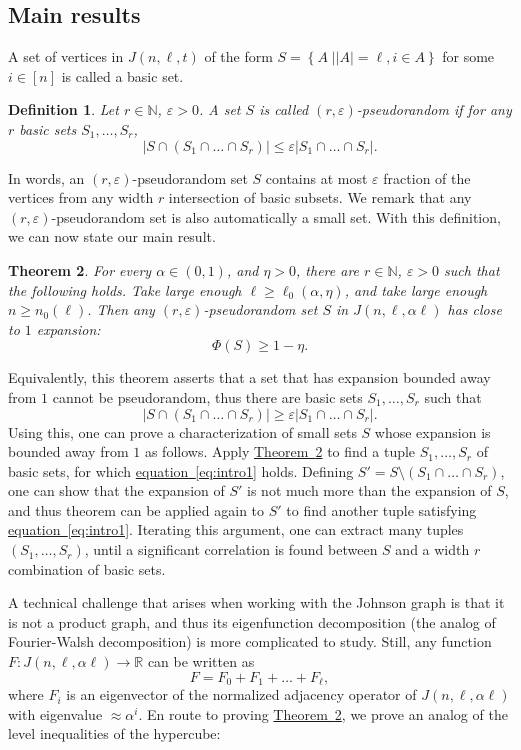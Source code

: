 \documentclass[11pt]{article}
\newcommand{\expref}[2]{\texorpdfstring{\hyperref[#2]{#1~\ref{#2}}}{#1~\ref{#2}}}
\newtheorem{theorem}{Theorem}[section]
\newtheorem{definition}[theorem]{Definition}
\newcommand{\expeqref}[2]{\texorpdfstring{\hyperref[#2]{#1~\eqref{#2}}}{#1~\eqref{#2}}}
\newcommand\card[1]{\left| {#1} \right|}
\newcommand\sett[2]{\left\{ \left. #1 \;\right\vert #2 \right\}}
\newcommand\skipi{{\vskip 10pt}}
\newcommand\eps{\varepsilon}
\renewcommand\geq{\geqslant}
\renewcommand\leq{\leqslant}
\begin{document}
\subsection{Main results}
A set of vertices in $J(n,\ell,t)$ of the form $S = \sett{A}{\card{A} = \ell, i\in A}$ for some $i\in [n]$ is called a
basic set.
\begin{definition}
  Let $r\in\mathbb{N}$, $\eps>0$. A set $S$ is called \emph{$(r,\eps)$-pseudorandom} if for any $r$ basic sets $S_1,\ldots,S_r$, %
  \[
   \card{S\cap (S_1\cap\ldots\cap S_r)}\leq \eps \card{S_1\cap\ldots\cap S_r}.
  \]
\end{definition}
In words, an $(r,\eps)$-pseudorandom set $S$ contains at most $\eps$ fraction of the vertices from any width $r$ intersection of basic subsets. We remark
that any $(r,\eps)$-pseudorandom set is also automatically a small set.
With this definition, we can now state our main result.
\begin{theorem}\label{thm:main_intro}
  For every $\alpha\in (0,1)$, and $\eta>0$, there are $r\in\mathbb{N}$, $\eps>0$ such that the following holds.
  Take large enough $\ell\geq\ell_0(\alpha,\eta)$, and take large enough $n\geq n_0(\ell)$. Then any $(r,\eps)$-pseudorandom set
  $S$ in $J(n,\ell,\alpha \ell)$ has close to $1$ expansion:
  \[
   \Phi(S)\geq 1-\eta.
  \]
\end{theorem}
Equivalently, this theorem asserts that a set that has expansion bounded away from $1$ cannot be pseudorandom, thus
there are basic sets %
$S_1,\ldots,S_r$ such that
\begin{equation}\label{eq:intro1}
 \card{S\cap(S_1\cap\ldots\cap S_r)}\geq \eps \card{S_1\cap\ldots\cap S_r}.
\end{equation}
Using this, one can prove a characterization of small sets $S$ whose expansion is bounded away from $1$ as follows.
Apply \expref{Theorem}{thm:main_intro} to find a tuple $S_1,\ldots,S_r$ of basic sets, for which \expeqref{equation}{eq:intro1} holds.
Defining $S' = S\setminus (S_1\cap\ldots \cap S_r)$, one can show that the expansion of $S'$ is not much more than the expansion of $S$, and thus theorem can be applied
again to $S'$ to find another tuple satisfying \expeqref{equation}{eq:intro1}.
Iterating this argument, one can extract many tuples $(S_1,\ldots,S_r)$, until a significant correlation is found between $S$ and a width $r$ combination
of basic sets.

\skipi

A technical challenge that arises when working with the Johnson graph %
is that it is not a product graph, and thus its eigenfunction decomposition (the analog
of Fourier-Walsh decomposition) is more complicated to study. Still, any function $F\colon J(n,\ell,\alpha \ell)\to\mathbb{R}$ can be written as
\begin{equation}\label{eq:intro''}
F = F_0+F_1+\ldots+F_{\ell},
\end{equation}
where $F_i$ is an eigenvector of the normalized adjacency operator of $J(n,\ell,\alpha\ell)$ with eigenvalue $\approx \alpha^i$.
En route to proving \expref{Theorem}{thm:main_intro}, we prove an analog of the level inequalities of the hypercube:
\end{document}
